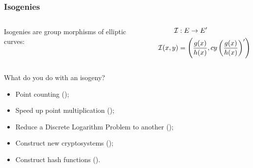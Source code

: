 \documentclass[10pt]{beamer}
\begin{document}

\begin{frame}
  \frametitle{Isogenies}
  
  \begin{columns}
    \begin{column}{0.5\textwidth}
      Isogenies are group morphisms of elliptic curves:
    \end{column}
    \begin{column}{0.5\textwidth}
      \begin{align*}
        \mathcal{I}      &:E\rightarrow E'\\
        \mathcal{I}(x,y) &= \left(\frac{g(x)}{h(x)}, cy\left(\frac{g(x)}{h(x)}\right)'\right)
      \end{align*}
    \end{column}
  \end{columns}

  \begin{block}{What do you do with an isogeny?}
    \begin{itemize}
    \item Point counting (\cite{schoof95});
    \item Speed up point multiplication (\cite{gallant+lambert+vanstone01});
    \item Reduce a Discrete Logarithm Problem to another (\cite{gaudry+hess+smart02,smith09});
    \item Construct new cryptosystems (\cite{teske06,rostovtsev+stolbunov06});
    \item Construct hash functions (\cite{charles+lauter+goren09}).
    \end{itemize}
  \end{block}
\end{frame}

\end{document}
